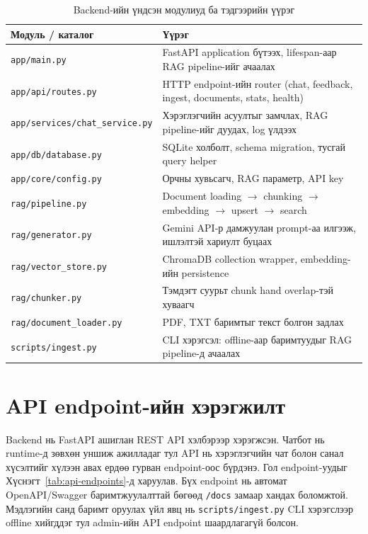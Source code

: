 \begin{table}[H]
\centering
\begin{tabular}{|p{6.0cm}|p{9.5cm}|}
\hline
\textbf{Модуль / каталог} & \textbf{Үүрэг} \\ \hline
\texttt{app/main.py} & FastAPI application бүтээх, lifespan-аар RAG pipeline-ийг ачаалах \\ \hline
\texttt{app/api/routes.py} & HTTP endpoint-ийн router (chat, feedback, ingest, documents, stats, health) \\ \hline
\texttt{app/services/chat\_service.py} & Хэрэглэгчийн асуултыг замчлах, RAG pipeline-ийг дуудах, log үлдээх \\ \hline
\texttt{app/db/database.py} & SQLite холболт, schema migration, тусгай query helper \\ \hline
\texttt{app/core/config.py} & Орчны хувьсагч, RAG параметр, API key \\ \hline
\texttt{rag/pipeline.py} & Document loading $\rightarrow$ chunking $\rightarrow$ embedding $\rightarrow$ upsert $\rightarrow$ search \\ \hline
\texttt{rag/generator.py} & Gemini API-р дамжуулан prompt-аа илгээж, ишлэлтэй хариулт буцаах \\ \hline
\texttt{rag/vector\_store.py} & ChromaDB collection wrapper, embedding-ийн persistence \\ \hline
\texttt{rag/chunker.py} & Тэмдэгт суурьт chunk hand overlap-тэй хуваагч \\ \hline
\texttt{rag/document\_loader.py} & PDF, TXT баримтыг текст болгон задлах \\ \hline
\texttt{scripts/ingest.py} & CLI хэрэгсэл: offline-аар баримтуудыг RAG pipeline-д ачаалах \\ \hline
\end{tabular}
\caption[Backend-ийн модулийн бүтэц]{Backend-ийн үндсэн модулиуд ба тэдгээрийн үүрэг}
\label{tab:backend-modules}
\end{table}

\section{API endpoint-ийн хэрэгжилт}

Backend нь FastAPI ашиглан REST API хэлбэрээр хэрэгжсэн. Чатбот нь runtime-д зөвхөн уншиж ажилладаг тул API нь хэрэглэгчийн чат болон санал хүсэлтийг хүлээн авах ердөө гурван endpoint-оос бүрдэнэ. Гол endpoint-уудыг Хүснэгт~\ref{tab:api-endpoints}-д харуулав. Бүх endpoint нь автомат OpenAPI/Swagger баримтжуулалттай бөгөөд \texttt{/docs} замаар хандах боломжтой. Мэдлэгийн санд баримт оруулах үйл явц нь \texttt{scripts/ingest.py} CLI хэрэгслээр offline хийгддэг тул admin-ийн API endpoint шаардлагагүй болсон.

